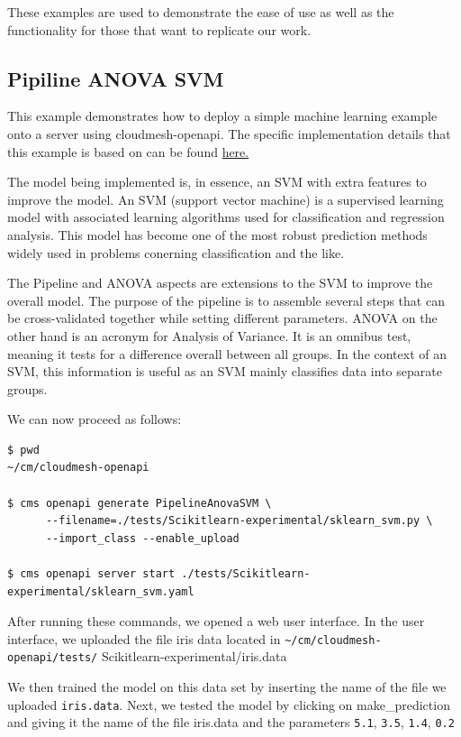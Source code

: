 These examples are used to demonstrate the ease of use as well as the
functionality for those that want to replicate our work.


\subsection{Pipiline ANOVA SVM}\label{a.2.-pipiline-anova-svm}

This example demonstrates how to deploy a simple machine learning
example onto a server using cloudmesh-openapi. The specific
implementation details that this example is based on can be found
\href{https://scikit-learn.org/stable/auto_examples/feature_selection/plot_feature_selection_pipeline.html}{here.}

The model being implemented is, in essence, an SVM with extra features
to improve the model. An SVM (support vector machine) is a supervised
learning model with associated learning algorithms used for
classification and regression analysis. This model has become one of the
most robust prediction methods widely used in problems conerning
classification and the like.

The Pipeline and ANOVA aspects are extensions to the SVM to improve the
overall model. The purpose of the pipeline is to assemble several steps
that can be cross-validated together while setting different parameters.
ANOVA on the other hand is an acronym for Analysis of Variance. It is an
omnibus test, meaning it tests for a difference overall between all
groups. In the context of an SVM, this information is useful as an SVM
mainly classifies data into separate groups.

We can now proceed as follows:

\begin{verbatim}
$ pwd
~/cm/cloudmesh-openapi

$ cms openapi generate PipelineAnovaSVM \
      --filename=./tests/Scikitlearn-experimental/sklearn_svm.py \
      --import_class --enable_upload

$ cms openapi server start ./tests/Scikitlearn-experimental/sklearn_svm.yaml
\end{verbatim}

After running these commands, we opened a web user interface. In the
user interface, we uploaded the file iris data located in
\verb|~/cm/cloudmesh-openapi/tests/|
Scikitlearn-experimental/iris.data

We then trained the model on this data set by inserting the name of the
file we uploaded \verb|iris.data|. Next, we tested the model by
clicking on make\_prediction and giving it the name of the file
iris.data and the parameters \verb|5.1|, \verb|3.5|, \verb|1.4|,
\verb|0.2|

